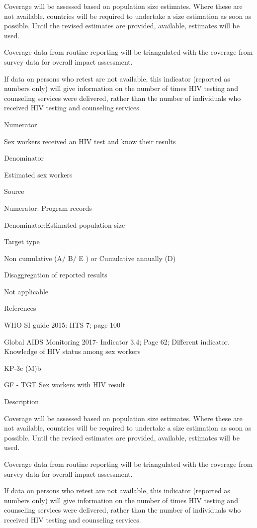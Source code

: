 \documentclass[]{book}
\begin{document}
Coverage will be assessed based on population size estimates. Where these are not available, countries will be required to undertake a size estimation as soon as possible. Until the revised estimates are provided, available, estimates will be used.

Coverage data from routine reporting will be triangulated with the coverage from survey data for overall impact assessment.

If data on persons who retest are not available, this indicator (reported as numbers only) will give information on the number of times HIV testing and counseling services were delivered, rather than the number of individuals who received HIV testing and counseling services.

Numerator

Sex workers received an HIV test and know their results

Denominator

Estimated sex workers

Source

Numerator: Program records

Denominator:Estimated population size

Target type

Non cumulative (A/ B/ E ) or Cumulative annually (D)

Disaggregation of reported results

Not applicable

References

WHO SI guide 2015: HTS 7; page 100

Global AIDS Monitoring 2017- Indicator 3.4; Page 62; Different indicator.
Knowledge of HIV status among sex workers

KP-3c (M)b

GF - TGT Sex workers with HIV result

Description

Coverage will be assessed based on population size estimates. Where these are not available, countries will be required to undertake a size estimation as soon as possible. Until the revised estimates are provided, available, estimates will be used.

Coverage data from routine reporting will be triangulated with the coverage from survey data for overall impact assessment.

If data on persons who retest are not available, this indicator (reported as numbers only) will give information on the number of times HIV testing and counseling services were delivered, rather than the number of individuals who received HIV testing and counseling services.
\end{document}
